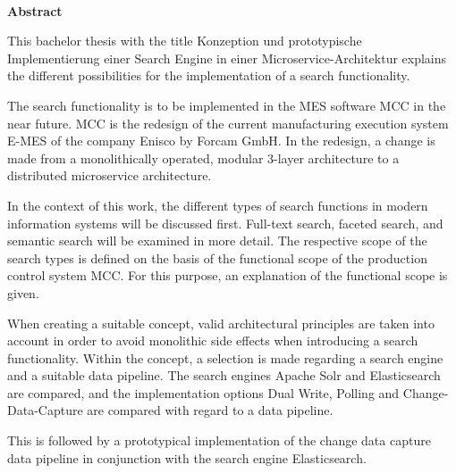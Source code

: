 
~

\vspace{17.1mm}

\begin{flushleft}
    \textbf{\huge{}Abstract}{\huge\par}
\par\end{flushleft}

This bachelor thesis with the title \glqq Konzeption und prototypische Implementierung einer Search Engine in einer Microservice-Architektur\grqq{} explains the different possibilities for the implementation of a search functionality.

The search functionality is to be implemented in the MES software \glqq MCC\grqq{} in the near future. \glqq MCC\grqq{} is the redesign of the current manufacturing execution system \glqq E-MES\grqq{} of the company Enisco by Forcam GmbH. In the redesign, a change is made from a monolithically operated, modular 3-layer architecture to a distributed microservice architecture.

In the context of this work, the different types of search functions in modern information systems will be discussed first. Full-text search, faceted search, and semantic search will be examined in more detail. The respective scope of the search types is defined on the basis of the functional scope of the production control system \glqq MCC\grqq{}. For this purpose, an explanation of the functional scope is given.

When creating a suitable concept, valid architectural principles are taken into account in order to avoid monolithic side effects when introducing a search functionality. Within the concept, a selection is made regarding a search engine and a suitable data pipeline. The search engines \glqq Apache Solr\grqq{} and \glqq Elasticsearch\grqq{} are compared, and the implementation options \glqq Dual Write\grqq{}, \glqq Polling\grqq{} and \glqq Change-Data-Capture\grqq{} are compared with regard to a data pipeline.

This is followed by a prototypical implementation of the change data capture data pipeline in conjunction with the search engine \glqq Elasticsearch\grqq{}. 
